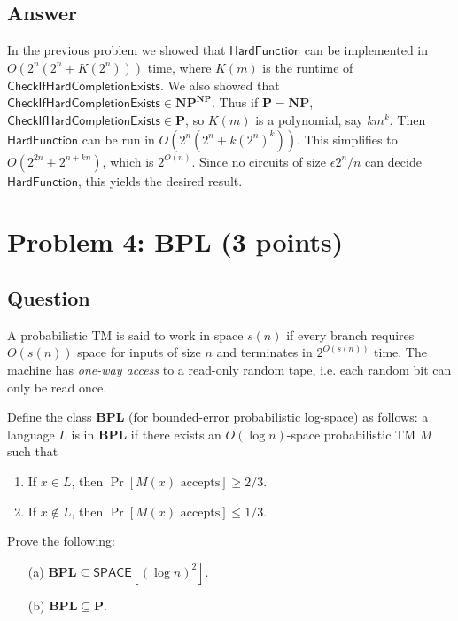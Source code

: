 \documentclass{article}
\renewcommand{\P}{\mathbf{P}}
\newcommand{\NP}{\mathbf{NP}}
\newcommand{\EXP}{\mathbf{EXP}}
\def \SPACE{{\mathsf{SPACE}}}
\def \BPL{{\mathbf{BPL}}}
\begin{document}
\subsection*{Answer}





In the previous problem we showed that $\mathsf{HardFunction}$ can be implemented in $O(2^n(2^n + K(2^n)))$ time, where $K(m)$ is the runtime of $\mathsf{CheckIfHardCompletionExists}$.
We also showed that $\mathsf{CheckIfHardCompletionExists} \in \NP^\NP$.
Thus if $\P = \NP$, $\mathsf{CheckIfHardCompletionExists} \in \P$, so $K(m)$ is a polynomial, say $km^k$.
Then $\mathsf{HardFunction}$ can be run in $O(2^n(2^n + k(2^n)^k))$.
This simplifies to $O(2^{2n} + 2^{n + kn})$, which is $2^{O(n)}$.
Since no circuits of size $\epsilon 2^n/n$ can decide $\mathsf{HardFunction}$, this yields the desired result.


\newpage
\section*{Problem 4: BPL (3 points)}

\subsection*{Question}
A probabilistic TM is said to work in space $s(n)$ if every branch requires $O(s(n))$ space for inputs of size $n$ and terminates in $2^{O(s(n))}$ time. The machine has \emph{one-way access} to a read-only random tape, i.e. each random bit can only be read once.

Define the class $\BPL$ (for bounded-error probabilistic log-space) as follows: a language $L$ is in $\BPL$ if there exists an $O(\log n)$-space probabilistic TM $M$ such that 
\begin{enumerate}
    \item If $x\in L$, then $\Pr[M(x)\text{ accepts}]\ge 2/3$.
    \item If $x\not\in L$, then $\Pr[M(x)\text{ accepts}]\le 1/3$.
\end{enumerate}
Prove the following:
\begin{enumerate}
    \item[(a)] $\BPL\subseteq \SPACE[(\log n)^2]$.
    \item[(b)] $\BPL\subseteq \P$.
\end{enumerate}
\end{document}
